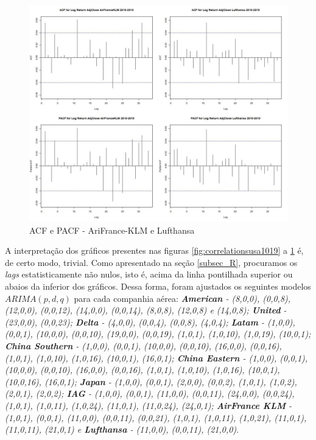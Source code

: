 \documentclass[12pt]{article}
\begin{document}
\begin{figure}[H]
	\centering
	\includegraphics[width=0.8\linewidth]{../Modelos/CorrelationsAirKLM10_19}
	\caption{ACF e PACF - AriFrance-KLM e Lufthansa}
	\label{fig:correlationsairklm1019}
\end{figure}

A interpretação dos gráficos presentes nas figuras \ref{fig:correlationsusa1019} a \ref{fig:correlationsairklm1019} é, de certo modo, trivial. Como apresentado na seção \ref{subsec_R}, procuramos os \textit{lags} estatisticamente não nulos, isto é, acima da linha pontilhada superior ou abaios da inferior dos gráficos. Dessa forma, foram ajustados os seguintes modelos $ARIMA(p,d,q)$ para cada companhia aérea: \emph{\textbf{American} - (8,0,0), (0,0,8), (12,0,0), (0,0,12), (14,0,0), (0,0,14), (8,0,8), (12,0,8) e (14,0,8); \textbf{United} - (23,0,0), (0,0,23); \textbf{Delta} - (4,0,0), (0,0,4), (0,0,8), (4,0,4); \textbf{Latam} - (1,0,0), (0,0,1), (10,0,0), (0,0,10), (19,0,0), (0,0,19), (1,0,1), (1,0,10), (1,0,19), (10,0,1); \textbf{China Southern} - (1,0,0), (0,0,1), (10,0,0), (0,0,10), (16,0,0), (0,0,16), (1,0,1), (1,0,10), (1,0,16), (10,0,1), (16,0,1); \textbf{China Eastern} - (1,0,0), (0,0,1), (10,0,0), (0,0,10), (16,0,0), (0,0,16), (1,0,1), (1,0,10), (1,0,16), (10,0,1), (10,0,16), (16,0,1); \textbf{Japan} - (1,0,0), (0,0,1), (2,0,0), (0,0,2), (1,0,1), (1,0,2), (2,0,1), (2,0,2); \textbf{IAG} - (1,0,0), (0,0,1), (11,0,0), (0,0,11), (24,0,0), (0,0,24), (1,0,1), (1,0,11), (1,0,24), (11,0,1), (11,0,24), (24,0,1); \textbf{AirFrance KLM} - (1,0,1), (0,0,1), (11,0,0), (0,0,11), (0,0,21), (1,0,1), (1,0,11), (1,0,21), (11,0,1), (11,0,11), (21,0,1) e \textbf{Lufthansa} - (11,0,0), (0,0,11), (21,0,0)}.
\end{document}
